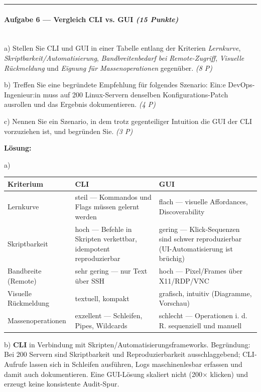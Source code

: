 \documentclass[11pt, a4paper]{article}
\begin{document}
\noindent\textcolor{rulegray}{\rule{\linewidth}{0.4pt}}


\paragraph{Aufgabe 6 — Vergleich CLI vs. GUI \textit{(15 Punkte)}}\mbox{}\\[2pt]

a) Stellen Sie CLI und GUI in einer Tabelle entlang der Kriterien \textit{Lernkurve}, \textit{Skriptbarkeit/Automatisierung}, \textit{Bandbreitenbedarf bei Remote-Zugriff}, \textit{Visuelle Rückmeldung} und \textit{Eignung für Massenoperationen} gegenüber. \textit{(8 P)}


b) Treffen Sie eine begründete Empfehlung für folgendes Szenario: Ein:e DevOps-Ingenieur:in muss auf 200 Linux-Servern denselben Konfigurations-Patch ausrollen und das Ergebnis dokumentieren. \textit{(4 P)}


c) Nennen Sie ein Szenario, in dem trotz gegenteiliger Intuition die GUI der CLI vorzuziehen ist, und begründen Sie. \textit{(3 P)}


\textbf{Lösung:}


a)



{\small
\begin{tabularx}{\linewidth}{XXX}
\hline
\rowcolor{tableheadbg}
{\color{white}\textbf{Kriterium}} & {\color{white}\textbf{CLI}} & {\color{white}\textbf{GUI}} \\[2pt]
\hline
\endhead
\hline
\endfoot
Lernkurve & steil — Kommandos und Flags müssen gelernt werden & flach — visuelle Affordances, Discoverability \\
Skriptbarkeit & hoch — Befehle in Skripten verkettbar, idempotent reproduzierbar & gering — Klick-Sequenzen sind schwer reproduzierbar (UI-Automatisierung ist brüchig) \\
Bandbreite (Remote) & sehr gering — nur Text über SSH & hoch — Pixel/Frames über X11/RDP/VNC \\
Visuelle Rückmeldung & textuell, kompakt & grafisch, intuitiv (Diagramme, Vorschau) \\
Massenoperationen & exzellent — Schleifen, Pipes, Wildcards & schlecht — Operationen i. d. R. sequenziell und manuell \\
\end{tabularx}
}


b) \textbf{CLI} in Verbindung mit Skripten/Automatisierungsframeworks. Begründung: Bei 200 Servern sind Skriptbarkeit und Reproduzierbarkeit ausschlaggebend; CLI-Aufrufe lassen sich in Schleifen ausführen, Logs maschinenlesbar erfassen und damit auch dokumentieren. Eine GUI-Lösung skaliert nicht (200× klicken) und erzeugt keine konsistente Audit-Spur.
\end{document}
